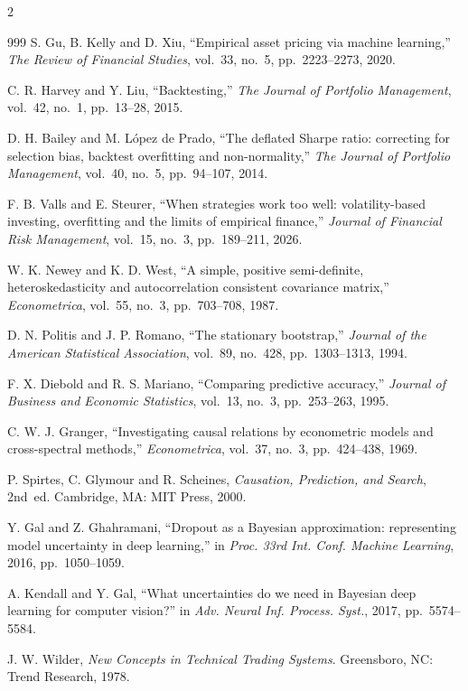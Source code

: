 \begin{footnotesize}
\begin{multicols}{2}
\begin{thebibliography}{999}
 S. Gu, B. Kelly and D. Xiu, ``Empirical asset pricing via machine learning,''
\emph{The Review of Financial Studies}, vol.~33, no.~5, pp.~2223--2273, 2020.

 C. R. Harvey and Y. Liu, ``Backtesting,'' \emph{The Journal of Portfolio
Management}, vol.~42, no.~1, pp.~13--28, 2015.

 D. H. Bailey and M. L\'opez de Prado, ``The deflated Sharpe ratio:
correcting for selection bias, backtest overfitting and non-normality,'' \emph{The Journal of
Portfolio Management}, vol.~40, no.~5, pp.~94--107, 2014.

 F. B. Valls and E. Steurer, ``When strategies work too well:
volatility-based investing, overfitting and the limits of empirical finance,'' \emph{Journal
of Financial Risk Management}, vol.~15, no.~3, pp.~189--211, 2026.

 W. K. Newey and K. D. West, ``A simple, positive semi-definite,
heteroskedasticity and autocorrelation consistent covariance matrix,''
\emph{Econometrica}, vol.~55, no.~3, pp.~703--708, 1987.

 D. N. Politis and J. P. Romano, ``The stationary bootstrap,''
\emph{Journal of the American Statistical Association}, vol.~89, no.~428, pp.~1303--1313,
1994.

 F. X. Diebold and R. S. Mariano, ``Comparing predictive accuracy,''
\emph{Journal of Business and Economic Statistics}, vol.~13, no.~3, pp.~253--263, 1995.

 C. W. J. Granger, ``Investigating causal relations by econometric models
and cross-spectral methods,'' \emph{Econometrica}, vol.~37, no.~3, pp.~424--438, 1969.

 P. Spirtes, C. Glymour and R. Scheines, \emph{Causation, Prediction, and
Search}, 2nd~ed. Cambridge, MA: MIT Press, 2000.

 Y. Gal and Z. Ghahramani, ``Dropout as a Bayesian approximation:
representing model uncertainty in deep learning,'' in \emph{Proc. 33rd Int. Conf. Machine
Learning}, 2016, pp.~1050--1059.

 A. Kendall and Y. Gal, ``What uncertainties do we need in Bayesian deep
learning for computer vision?'' in \emph{Adv. Neural Inf. Process. Syst.}, 2017,
pp.~5574--5584.

 J. W. Wilder, \emph{New Concepts in Technical Trading Systems}.
Greensboro, NC: Trend Research, 1978.

\end{thebibliography}
\end{multicols}
\end{footnotesize}

